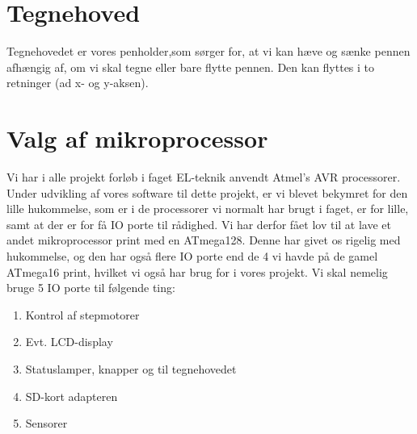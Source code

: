 \section{Tegnehoved}
\label{sc:d-tegnehoved}
Tegnehovedet er vores penholder,som sørger for, at vi kan hæve og sænke
pennen afhængig af, om vi skal tegne eller bare flytte pennen. Den kan
flyttes i to retninger (ad x- og y-aksen).

\section{Valg af mikroprocessor}
\label{sc:d-mikroprocessor}
Vi har i alle projekt forløb i faget EL-teknik anvendt Atmel's AVR
processorer. Under udvikling af vores software til dette projekt, er
vi blevet bekymret for den lille hukommelse, som er i de processorer
vi normalt har brugt i faget, er for lille, samt at der er for få IO
porte til rådighed.  Vi har derfor fået lov til at lave et andet
mikroprocessor print med en ATmega128. Denne har givet os rigelig med
hukommelse, og den har også flere IO porte end de 4 vi havde på de
gamel ATmega16 print, hvilket vi også har brug for i vores projekt. Vi
skal nemelig bruge 5 IO porte til følgende ting:

\begin{enumerate} \firmlist
\item{Kontrol af stepmotorer}
\item{Evt. LCD-display}
\item{Statuslamper, knapper og til tegnehovedet}
\item{SD-kort adapteren}
\item{Sensorer}
\end{enumerate}

